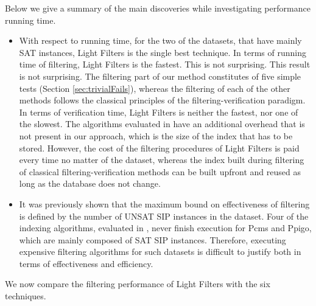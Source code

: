\documentclass{l4proj}
\begin{document}
Below we give a summary of the main discoveries while investigating performance running time.
\begin{itemize}
\item With respect to running time, for the two of the datasets, that have mainly SAT instances, Light Filters is the single best technique. In terms of running time of filtering, Light Filters is the fastest. This is not surprising. This result is not surprising. The filtering part of our method constitutes of five simple tests (Section \ref{sec:trivialFails}), whereas the filtering of each of the other methods follows the classical principles of the filtering-verification paradigm. In terms of verification time, Light Filters is neither the fastest, nor one of the slowest. The algorithms evaluated in \cite{foteini} have an additional overhead that is not present in our approach, which is the size of the index that has to be stored. However, the cost of the filtering procedures of Light Filters is paid every time no matter of the dataset, whereas the index built during filtering of classical filtering-verification methods can be built upfront and reused as long as the database does not change.
\item It was previously shown that the maximum bound on effectiveness of filtering is defined by the number of UNSAT SIP instances in the dataset. Four of the indexing algorithms, evaluated in \cite{foteini}, never finish execution for Pcms and Ppigo, which are mainly composed of SAT SIP instances. Therefore, executing expensive filtering algorithms for such datasets is difficult to justify both in terms of effectiveness and efficiency.
\end{itemize}


We now compare the filtering performance of Light Filters with the six techniques.
\end{document}
